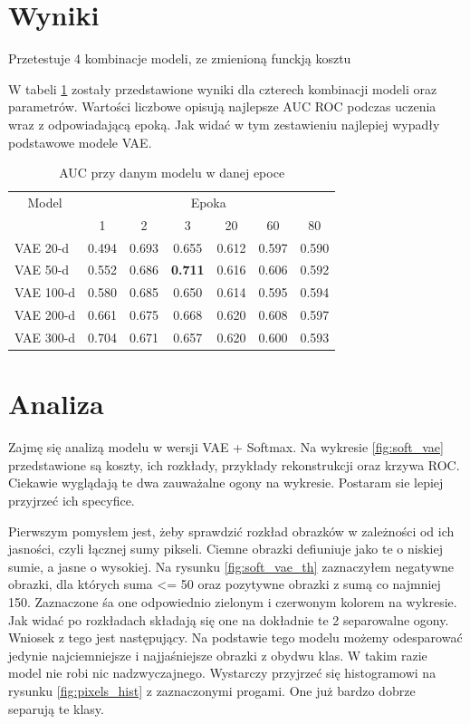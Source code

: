 \section{Wyniki}

Przetestuje 4 kombinacje modeli, ze zmienioną funckją kosztu

W tabeli \ref{table:results} zostały przedstawione wyniki dla czterech kombinacji modeli oraz parametrów. Wartości liczbowe opisują najlepsze AUC ROC podczas uczenia wraz z odpowiadającą epoką. Jak widać w tym zestawieniu najlepiej wypadły podstawowe modele VAE.

\begin{table}[h!]
	\centering
    \begin{tabular}{ l | c c c c c c }
 
    \multicolumn{1}{c}{Model} & \multicolumn{6}{c}{Epoka} \\
    \cmidrule(r){1-1} \cmidrule(r){2-7}
     		& 1 & 2 & 3 & 20 & 60 & 80 \\ \cmidrule(r){2-7}
    VAE 20-d 	& 0.494 & 0.693 & 0.655 & 0.612 & 0.597 & 0.590 \\ \hline
    VAE 50-d 	& 0.552 & 0.686 & \textbf{0.711} & 0.616 & 0.606 & 0.592 \\ \hline
    VAE 100-d 	& 0.580 & 0.685 & 0.650 & 0.614 & 0.595 & 0.594 \\ \hline
    VAE 200-d   & 0.661 & 0.675 & 0.668 & 0.620 & 0.608 & 0.597 \\ \hline
    VAE 300-d   & 0.704 & 0.671 & 0.657 & 0.620 & 0.600 & 0.593 \\
    \toprule
    \end{tabular}
    \caption{AUC przy danym modelu w danej epoce}
	\label{table:results}
\end{table}

\section{Analiza}

Zajmę się analizą modelu w wersji VAE + Softmax. Na wykresie \ref{fig:soft_vae} przedstawione są koszty, ich rozkłady, przykłady rekonstrukcji oraz krzywa ROC. Ciekawie wyglądają te dwa zauważalne ogony na wykresie. Postaram sie lepiej przyjrzeć ich specyfice. 

Pierwszym pomysłem jest, żeby sprawdzić rozkład obrazków w zależności od ich jasności, czyli łącznej sumy pikseli. Ciemne obrazki defiuniuje jako te o niskiej sumie, a jasne o wysokiej. Na rysunku \ref{fig:soft_vae_th} zaznaczyłem negatywne obrazki, dla których suma <= 50 oraz pozytywne obrazki z sumą co najmniej 150. Zaznaczone śa one odpowiednio zielonym i czerwonym kolorem na wykresie. Jak widać po rozkładach składają się one na dokładnie te 2 separowalne ogony. Wniosek z tego jest następujący. Na podstawie tego modelu możemy odesparować jedynie najciemniejsze i najjaśniejsze obrazki z obydwu klas. W takim razie model nie robi nic nadzwyczajnego. Wystarczy przyjrzeć się histogramowi na rysunku \ref{fig:pixels_hist} z zaznaczonymi progami. One już bardzo dobrze separują te klasy. 

